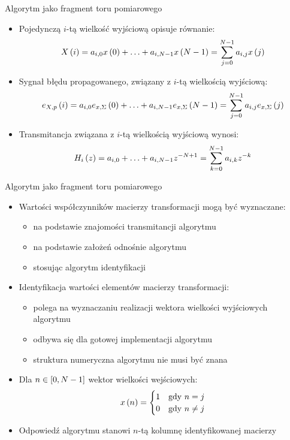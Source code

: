 \documentclass[12pt, polish, aspectratio = 169]{beamer}
\begin{document}
\begin{frame}{Algorytm jako fragment toru pomiarowego}
\begin{itemize}
\item Pojedynczą $i$-tą wielkość wyjściową opisuje równanie:
\begin{equation}
X \left(i\right) = a_{i, 0} x \left(0\right) + \hdots + a_{i, N-1} x \left(N-1\right) = \sum _{j = 0} ^{N-1} a_{i,j} x \left(j\right) \label{eq:alg_out_single}
\end{equation}
\item Sygnał błędu propagowanego, związany z $i$-tą wielkością wyjściową:
\begin{equation}
e_{X,p} \left(i\right) = a_{i, 0} e_{x,\Sigma} \left(0\right) + \hdots + a_{i, N-1} e_{x,\Sigma} \left(N-1\right) = \sum _{j = 0} ^{N-1} a_{i,j} e_{x,\Sigma} \left(j\right) \label{eq:alg_outerr}
\end{equation}
\item Transmitancja związana z $i$-tą wielkością wyjściową wynosi:
\begin{equation}
H_{i} \left(z\right) = a_{i, 0} + \hdots + a_{i, N-1} z^{-N+1} = \sum _{k = 0} ^{N-1} a_{i, k} z^{-k} \label{eq:alg_trans_single}
\end{equation}
\end{itemize}
\end{frame}

\begin{frame}{Algorytm jako fragment toru pomiarowego}
\begin{itemize}
\item Wartości współczynników macierzy transformacji mogą być wyznaczane:
	\begin{itemize}
	\item na podstawie znajomości transmitancji algorytmu
	\item na podstawie założeń odnośnie algorytmu
	\item stosując algorytm identyfikacji
	\end{itemize}
\item Identyfikacja wartości elementów macierzy transformacji:
	\begin{itemize}
	\item polega na wyznaczaniu realizacji wektora wielkości wyjściowych algorytmu
	\item odbywa się dla gotowej implementacji algorytmu
	\item struktura numeryczna algorytmu nie musi być znana
	\end{itemize}
\item Dla $n \in \interval{0}{N-1}$ wektor wielkości wejściowych:
\begin{equation}
x \emb{n} =
\begin{cases}
	1 & $gdy$~n = j \\
	0 & $gdy$~n \neq j
\end{cases}
\label{eq:wt_ident}
\end{equation}
\item Odpowiedź algorytmu stanowi $n$-tą kolumnę identyfikowanej macierzy
\end{itemize}
\end{frame}
\end{document}
